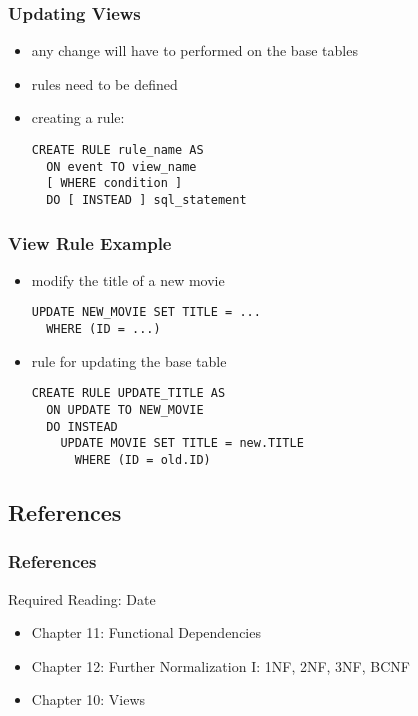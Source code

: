 \documentclass[dvipsnames]{beamer}
\begin{document}
\begin{frame}[fragile]
  \frametitle{Updating Views}

  \begin{itemize}
    \item any change will have to performed on the base tables
    \item rules need to be defined

    \pause
    \bigskip
    \item creating a rule:
    \begin{lstlisting}
CREATE RULE rule_name AS
  ON event TO view_name
  [ WHERE condition ]
  DO [ INSTEAD ] sql_statement
    \end{lstlisting}
  \end{itemize}
\end{frame}

\begin{frame}[fragile]
  \frametitle{View Rule Example}

  \begin{itemize}
    \item modify the title of a new movie
    \begin{lstlisting}
UPDATE NEW_MOVIE SET TITLE = ...
  WHERE (ID = ...)
    \end{lstlisting}

    \pause
    \medskip
    \item rule for updating the base table
    \begin{lstlisting}
CREATE RULE UPDATE_TITLE AS
  ON UPDATE TO NEW_MOVIE
  DO INSTEAD
    UPDATE MOVIE SET TITLE = new.TITLE
      WHERE (ID = old.ID)
    \end{lstlisting}
  \end{itemize}
\end{frame}

\subsection*{References}

\begin{frame}
  \frametitle{References}

  \begin{block}{Required Reading: Date}
    \begin{itemize}
      \item Chapter 11: \alert{Functional Dependencies}
      \item Chapter 12: \alert{Further Normalization I: 1NF, 2NF, 3NF, BCNF}
      \item Chapter 10: \alert{Views}
    \end{itemize}
  \end{block}
\end{frame}
\end{document}
